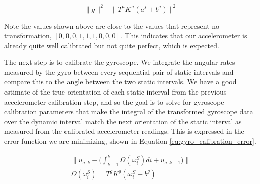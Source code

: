 \documentclass{article}
\begin{document}
    \begin{equation} \label{eq:accel_calibration_error}
      \rVert g\lVert^2 - \rVert T^aK^a(a^s+b^a)\lVert^2
    \end{equation}

    \begin{table}[H]
      \centering
      \caption{IMU Calibration Values}
      \label{table:imu_calibration_values}
    \end{table}

    Note the values shown above are close to the values that represent no transformation, $[0, 0, 0, 1, 1, 1, 0, 0, 0]$. This indicates that our accelerometer is already quite well calibrated but not quite perfect, which is expected.

    The next step is to calibrate the gyroscope. We integrate the angular rates measured by the gyro between every sequential pair of static intervals and compare this to the angle between the two static intervals. We have a good estimate of the true orientation of each static interval from the previous accelerometer calibration step, and so the goal is to solve for gyroscope calibration parameters that make the integral of the transformed gyroscope data over the dynamic interval match the next orientation of the static interval as measured from the calibrated accelerometer readings. This is expressed in the error function we are minimizing, shown in Equation \ref{eq:gyro_calibration_error}.

    \begin{equation} \label{eq:gyro_calibration_error}
      \begin{split}
        \bigg\lVert u_{a,k} - \bigg(\int_{k-1}^{k} \Omega(\omega^S_i)di + u_{a,k-1}\bigg) \bigg\lVert \\
      \Omega(\omega^S_i) = T^gK^g(\omega^S_i+b^g)
      \end{split}
    \end{equation}
\end{document}
